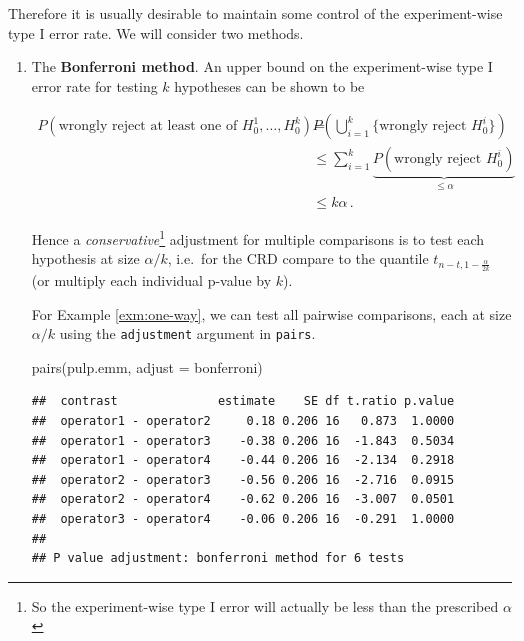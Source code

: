 \documentclass[
]{book}
\newenvironment{Shaded}{\begin{snugshade}}{\end{snugshade}}
\newcommand{\AttributeTok}[1]{\textcolor[rgb]{0.77,0.63,0.00}{#1}}
\newcommand{\FunctionTok}[1]{\textcolor[rgb]{0.00,0.00,0.00}{#1}}
\newcommand{\NormalTok}[1]{#1}
\newcommand{\StringTok}[1]{\textcolor[rgb]{0.31,0.60,0.02}{#1}}
\theoremstyle{definition}
\theoremstyle{definition}
\theoremstyle{definition}
\theoremstyle{definition}
\theoremstyle{remark}
\begin{document}
Therefore it is usually desirable to maintain some control of the experiment-wise type I error rate. We will consider two methods.

\begin{enumerate}
\def\labelenumi{\arabic{enumi}.}
\item
  The \textbf{Bonferroni method}. An upper bound on the experiment-wise type I error rate for testing \(k\) hypotheses can be shown to be

  \begin{align*}
  P(\mbox{wrongly reject at least one of } H_{0}^1, \ldots, H_{0}^k) = &    P\left(\bigcup_{i=1}^{k}\{\mbox{wrongly reject } H_{0}^i\}\right) \\
  & \leq \sum_{i=1}^{k}\underbrace{P(\mbox{wrongly reject } H_{0}^i)}_{\leq \alpha} \\ 
  & \leq k\alpha\,.
  \end{align*}

  Hence a \emph{conservative}\footnote{So the experiment-wise type I error will actually be less than the prescribed \(\alpha\)} adjustment for multiple comparisons is to test each hypothesis at size \(\alpha / k\), i.e.~for the CRD compare to the quantile \(t_{n-t, 1-\frac{\alpha}{2k}}\) (or multiply each individual p-value by \(k\)).

  For Example \ref{exm:one-way}, we can test all pairwise comparisons, each at size \(\alpha/k\) using the \texttt{adjustment} argument in \texttt{pairs}.

\begin{Shaded}
\begin{Highlighting}[]
\FunctionTok{pairs}\NormalTok{(pulp.emm, }\AttributeTok{adjust =} \StringTok{\textquotesingle{}bonferroni\textquotesingle{}}\NormalTok{)}
\end{Highlighting}
\end{Shaded}

\begin{verbatim}
##  contrast              estimate    SE df t.ratio p.value
##  operator1 - operator2     0.18 0.206 16   0.873  1.0000
##  operator1 - operator3    -0.38 0.206 16  -1.843  0.5034
##  operator1 - operator4    -0.44 0.206 16  -2.134  0.2918
##  operator2 - operator3    -0.56 0.206 16  -2.716  0.0915
##  operator2 - operator4    -0.62 0.206 16  -3.007  0.0501
##  operator3 - operator4    -0.06 0.206 16  -0.291  1.0000
## 
## P value adjustment: bonferroni method for 6 tests
\end{verbatim}


\end{enumerate}
\end{document}
